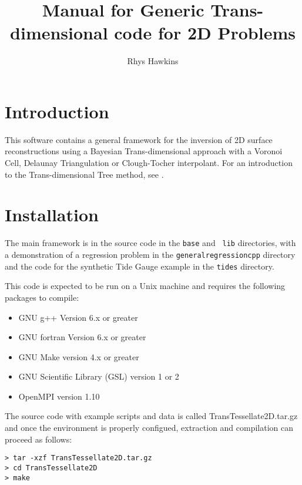 \documentclass[a4paper,12pt]{article}
\begin{document}
\title{Manual for Generic Trans-dimensional code for 2D Problems}
\author{Rhys Hawkins}

\maketitle

\tableofcontents

\section{Introduction}

This software contains a general framework for the inversion of 2D
surface reconstructions using a Bayesian Trans-dimensional approach
with a Voronoi Cell, Delaunay Triangulation or Clough-Tocher
interpolant.  For an introduction to the Trans-dimensional Tree
method, see \citet{Hawkins:2018:B}.

\section{Installation}

The main framework is in the source code in the {\tt base} and {\tt
  lib} directories, with a demonstration of a regression problem in
the {\tt generalregressioncpp} directory and the code for the
synthetic Tide Gauge example in the {\tt tides} directory.

This code is expected to be run on a Unix machine and requires the
following packages to compile:

\begin{itemize}
\item GNU g++ Version 6.x or greater
\item GNU fortran Version 6.x or greater
\item GNU Make version 4.x or greater
\item GNU Scientific Library (GSL) version 1 or 2
\item OpenMPI version 1.10
\end{itemize}

The source code with example scripts and data is called
TransTessellate2D.tar.gz and once the environment is properly
configued, extraction and compilation can proceed as follows:

\begin{verbatim}
> tar -xzf TransTessellate2D.tar.gz
> cd TransTessellate2D
> make 
\end{verbatim}
\end{document}
